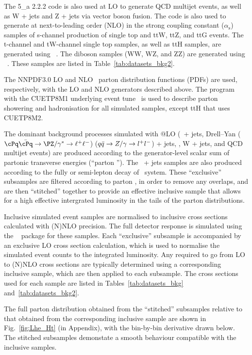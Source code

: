 The {\MADGRAPH{}5\_a\MCATNLO} 2.2.2 code is also used at LO to
generate QCD multijet events, as well as W + jets and Z + jets via
vector boson fusion. The \MADGRAPH{} code is also used to generate at
next-to-leading order (NLO) in the strong coupling constant
($\alpha_\textrm{s}$) samples of s-channel production of single top
and ttW, ttZ, and ttG events. The t-channel and tW-channel single top
samples, as well as ttH samples, are generated using
\POWHEG~\cite{}. The diboson samples (WW, WZ, and ZZ) are generated
using \PYTHIA~\cite{}. These samples are listed in
Table~\ref{tab:datasets_bkg2}.

The {NNPDF}3.0 LO and NLO~\cite{nnpdf} parton distribution functions
(PDFs) are used, respectively, with the LO and NLO generators
described above. The \PYTHIA program with the CUETP8M1 underlying
event tune~\cite{Khachatryan:2015pea} is used to describe parton
showering and hadronisation for all simulated samples, except ttH that
uses CUETP8M2.

The dominant background processes simulated with \MADGRAPH{}@LO
(\znunu\ + jets, Drell--Yan ($\cPq\bar{\cPq} \to \PZ/\gamma^* \to
\ell^+\ell^-$) ($q\bar{q} \rightarrow Z/\gamma \rightarrow l^+l^-$) + jets, \gj, W +
jets, and QCD multijet events) are produced according to the
generator-level scalar sum of partonic transverse energies (``parton
\scalht''). The \ttbar\ + jets samples are also produced according to
the fully or semi-lepton decay of \ttbar\ system. These ``exclusive''
subsamples are filtered according to parton \scalht, in order to
remove any overlaps, and are then ``stitched'' together to provide an
effective inclusive sample that allows for a high effective
intergrated luminosity in the tails of the parton \scalht
distributions.

Inclusive simulated event samples are normalised to inclusive cross
sections calculated with (N)NLO precision. The full detector response
is simulated using the \GEANTfour~\cite{geant} package for these
samples. Each ``exclusive'' subsample is accompanied by an exclusive
LO cross section calculation, which is used to normalise the simulated
event counts to the integrated luminosity. Any \kfactors required to
go from LO to (N)NLO cross sections are typically determined using a
corresponding inclusive sample, which are then applied to each
subsample. The cross sections used for each sample are listed in
Tables~\ref{tab:datasets_bkg} and~\ref{tab:datasets_bkg2}.

The full parton \scalht distribution obtained from the ``stitched''
subsamples relative to that obtained from the corresponding inclusive
sample are shown in Fig.~\ref{fig:Lhe_Ht} (in Appendix), with the
bin-by-bin derivative drawn below. The stitched subsamples demonstate
a smooth behaviour compatible with the inclusive samples.

